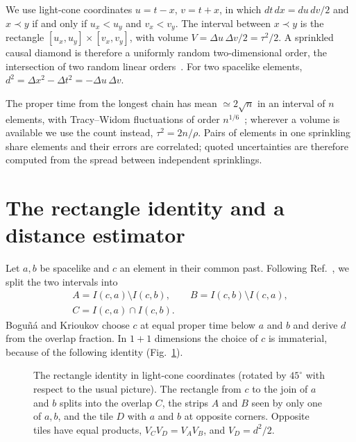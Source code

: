 \documentclass[prd,twocolumn,superscriptaddress,nofootinbib,amsmath,amssymb,floatfix]{revtex4-2}
\begin{document}
We use light-cone coordinates $u=t-x$, $v=t+x$, in which $dt\,dx=du\,dv/2$ and $x\prec y$ if and only if $u_x<u_y$ and $v_x<v_y$. The interval between $x\prec y$ is the rectangle $[u_x,u_y]\times[v_x,v_y]$, with volume $V=\Delta u\,\Delta v/2=\tau^2/2$. A sprinkled causal diamond is therefore a uniformly random two-dimensional order, the intersection of two random linear orders~\cite{BHS08,Surya12}. For two spacelike elements, $d^2=\Delta x^2-\Delta t^2=-\Delta u\,\Delta v$.

The proper time from the longest chain has mean $\simeq2\sqrt n$ in an interval of $n$ elements, with Tracy--Widom fluctuations of order $n^{1/6}$~\cite{BDJ99}; wherever a volume is available we use the count instead, $\tau^2=2n/\rho$. Pairs of elements in one sprinkling share elements and their errors are correlated; quoted uncertainties are therefore computed from the spread between independent sprinklings.

\section{The rectangle identity and a distance estimator}\label{sec:dist}
Let $a,b$ be spacelike and $c$ an element in their common past. Following Ref.~\cite{BK24}, we split the two intervals into
\begin{equation}
\begin{gathered}
A=I(c,a)\setminus I(c,b),\qquad B=I(c,b)\setminus I(c,a),\\
C=I(c,a)\cap I(c,b).
\end{gathered}
\end{equation}
Bogu\~n\'a and Krioukov choose $c$ at equal proper time below $a$ and $b$ and derive $d$ from the overlap fraction. In $1+1$ dimensions the choice of $c$ is immaterial, because of the following identity (Fig.~\ref{fig:tiles}).

\begin{figure}[t]
\centering
{}
\caption{The rectangle identity in light-cone coordinates (rotated by $45^\circ$ with respect to the usual picture). The rectangle from $c$ to the join of $a$ and $b$ splits into the overlap $C$, the strips $A$ and $B$ seen by only one of $a,b$, and the tile $D$ with $a$ and $b$ at opposite corners. Opposite tiles have equal products, $V_CV_D=V_AV_B$, and $V_D=d^2/2$.}
\label{fig:tiles}
\end{figure}
\end{document}
